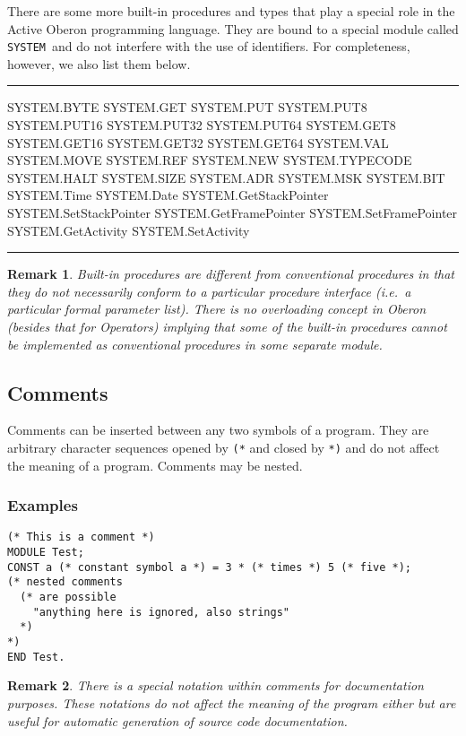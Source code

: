 \documentclass[a4wide,11pt]{article}
\newtheorem{remark}{Remark}
\newcommand{\SYSTEM}{\lstinline"SYSTEM"}
\newcommand{\srcfont}{\usefont{T1}{lmtt}{b}{n}}
\newenvironment{codebox}{%
\par
\begin{minipage}{\linewidth}
\hrule\vspace{0.1cm}
}{
\vspace{0.1cm}
\hrule
\end{minipage}
}
\begin{document}
There are some more built-in procedures and types that play a special role in the Active Oberon programming language.
They are bound to a special module called \SYSTEM\ and do not interfere with the use of identifiers.
For completeness, however, we also list them below.

\begin{codebox}
\srcfont
SYSTEM.BYTE
SYSTEM.GET
SYSTEM.PUT
SYSTEM.PUT8
SYSTEM.PUT16
SYSTEM.PUT32
SYSTEM.PUT64
SYSTEM.GET8
SYSTEM.GET16
SYSTEM.GET32
SYSTEM.GET64
SYSTEM.VAL
SYSTEM.MOVE
SYSTEM.REF
SYSTEM.NEW
SYSTEM.TYPECODE
SYSTEM.HALT
SYSTEM.SIZE
SYSTEM.ADR
SYSTEM.MSK
SYSTEM.BIT
SYSTEM.Time
SYSTEM.Date
SYSTEM.GetStackPointer
SYSTEM.SetStackPointer
SYSTEM.GetFramePointer
SYSTEM.SetFramePointer
SYSTEM.GetActivity
SYSTEM.SetActivity
\end{codebox}

\begin{remark}
Built-in procedures are different from conventional procedures in that they do not necessarily conform to a particular procedure interface (i.e.\ a particular formal parameter list).
There is no overloading concept in Oberon (besides that for Operators) implying that some of the built-in procedures cannot be implemented as conventional procedures in some separate module.
\end{remark}

\subsection{Comments}
Comments can be inserted between any two symbols of a program.
They are arbitrary character sequences opened by \lstinline"(*" and closed by \lstinline"*)" and do not affect the meaning of a program.
Comments may be nested.

\begin{annotation}
\subsubsection{Examples}
\begin{lstlisting}[style=example,caption=Examples of comments]
(* This is a comment *)
MODULE Test;
CONST a (* constant symbol a *) = 3 * (* times *) 5 (* five *);
(* nested comments
  (* are possible
    "anything here is ignored, also strings"
  *)
*)
END Test.
\end{lstlisting}

\begin{remark}
There is a special notation within comments for documentation purposes.
These notations do not affect the meaning of the program either but are useful for automatic generation of source code documentation.
\end{remark}
\end{annotation}
\end{document}
